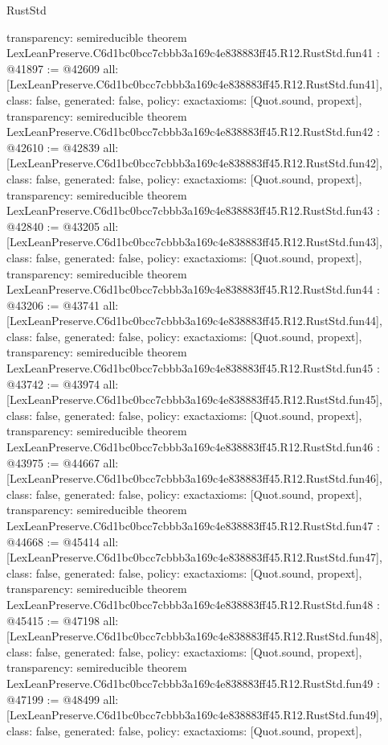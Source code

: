 \begin{lexlean}{RustStd}
\begin{coremodule}
{  transparency: semireducible
}
theorem LexLeanPreserve.C6d1bc0bcc7cbbb3a169c4e838883ff45.R12.RustStd.fun41 : @41897 := @42609 {
  all: [LexLeanPreserve.C6d1bc0bcc7cbbb3a169c4e838883ff45.R12.RustStd.fun41],
  class: false,
  generated: false,
  policy: exact{axioms: [Quot.sound, propext]},
  transparency: semireducible
}
theorem LexLeanPreserve.C6d1bc0bcc7cbbb3a169c4e838883ff45.R12.RustStd.fun42 : @42610 := @42839 {
  all: [LexLeanPreserve.C6d1bc0bcc7cbbb3a169c4e838883ff45.R12.RustStd.fun42],
  class: false,
  generated: false,
  policy: exact{axioms: [Quot.sound, propext]},
  transparency: semireducible
}
theorem LexLeanPreserve.C6d1bc0bcc7cbbb3a169c4e838883ff45.R12.RustStd.fun43 : @42840 := @43205 {
  all: [LexLeanPreserve.C6d1bc0bcc7cbbb3a169c4e838883ff45.R12.RustStd.fun43],
  class: false,
  generated: false,
  policy: exact{axioms: [Quot.sound, propext]},
  transparency: semireducible
}
theorem LexLeanPreserve.C6d1bc0bcc7cbbb3a169c4e838883ff45.R12.RustStd.fun44 : @43206 := @43741 {
  all: [LexLeanPreserve.C6d1bc0bcc7cbbb3a169c4e838883ff45.R12.RustStd.fun44],
  class: false,
  generated: false,
  policy: exact{axioms: [Quot.sound, propext]},
  transparency: semireducible
}
theorem LexLeanPreserve.C6d1bc0bcc7cbbb3a169c4e838883ff45.R12.RustStd.fun45 : @43742 := @43974 {
  all: [LexLeanPreserve.C6d1bc0bcc7cbbb3a169c4e838883ff45.R12.RustStd.fun45],
  class: false,
  generated: false,
  policy: exact{axioms: [Quot.sound, propext]},
  transparency: semireducible
}
theorem LexLeanPreserve.C6d1bc0bcc7cbbb3a169c4e838883ff45.R12.RustStd.fun46 : @43975 := @44667 {
  all: [LexLeanPreserve.C6d1bc0bcc7cbbb3a169c4e838883ff45.R12.RustStd.fun46],
  class: false,
  generated: false,
  policy: exact{axioms: [Quot.sound, propext]},
  transparency: semireducible
}
theorem LexLeanPreserve.C6d1bc0bcc7cbbb3a169c4e838883ff45.R12.RustStd.fun47 : @44668 := @45414 {
  all: [LexLeanPreserve.C6d1bc0bcc7cbbb3a169c4e838883ff45.R12.RustStd.fun47],
  class: false,
  generated: false,
  policy: exact{axioms: [Quot.sound, propext]},
  transparency: semireducible
}
theorem LexLeanPreserve.C6d1bc0bcc7cbbb3a169c4e838883ff45.R12.RustStd.fun48 : @45415 := @47198 {
  all: [LexLeanPreserve.C6d1bc0bcc7cbbb3a169c4e838883ff45.R12.RustStd.fun48],
  class: false,
  generated: false,
  policy: exact{axioms: [Quot.sound, propext]},
  transparency: semireducible
}
theorem LexLeanPreserve.C6d1bc0bcc7cbbb3a169c4e838883ff45.R12.RustStd.fun49 : @47199 := @48499 {
  all: [LexLeanPreserve.C6d1bc0bcc7cbbb3a169c4e838883ff45.R12.RustStd.fun49],
  class: false,
  generated: false,
  policy: exact{axioms: [Quot.sound, propext]},
}
\end{coremodule}
\end{lexlean}

